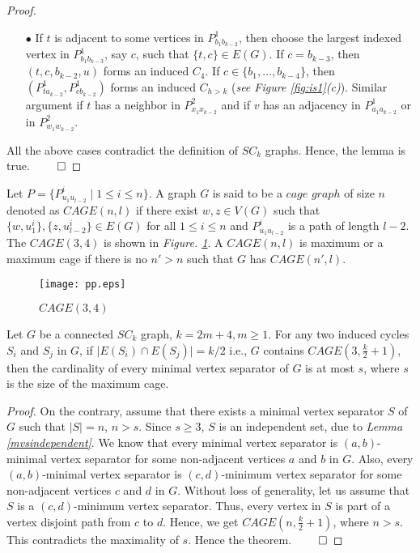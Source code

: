 \documentclass[runningheads]{llncs}
\begin{document}
\begin{proof}
\begin{description}
\begin{itemize}
\item[$\bullet$] If $t$ is adjacent to some vertices in $P^{1}_{b_1b_{k-2}}$, then choose the largest indexed vertex in $P^{1}_{b_1b_{k-3}}$, say $c$, such that  $\{t,c\}\in E(G)$. If $c=b_{k-3}$, then $(t,c, b_{k-2},u)$ forms an induced $C_4$. If $c \in \{b_1,\ldots,b_{k-4}\}$, then $(P^{1}_{ta_{k-2}}, P^{1}_{cb_{k-2}})$ forms an induced $C_{h > k}$ (\emph{see Figure  \ref{fig:is1}(c)}). Similar argument if $t$ has a neighbor in $P^{2}_{x_1x_{k-2}}$ and if $v$ has an adjacency in $P^{1}_{a_1a_{k-2}}$ or in $P^{2}_{w_1w_{k-2}}$.
\end{itemize}
\end{description}
All the above cases contradict the definition of $SC_k$ graphs. Hence, the lemma is true. $\hfill \qed$
\end{proof}


\begin{definition}
Let $P = \{ P_{u_1u_{l-2}}^{i} \mid 1\leq i \leq n\}$. A graph $G$ is said to be a $cage$ $graph$ of size $n$ denoted as $CAGE(n,l)$ if there exist $w,z \in V(G)$ such that $\{w,u_{1}^{i}\}, \{z,u_{l-2}^{i}\} \in E(G)$ for all $1 \leq i \leq n$ and $P_{u_1u_{l-2}}^{i} $ is a path of length $l-2$. The $CAGE(3,4)$ is shown in \emph{Figure. \ref{fig:pp}}. A $CAGE(n,l)$ is maximum or a maximum cage if there is no $n' > n$ such that $G$ has $CAGE(n',l)$.
\end{definition}



\begin{figure}[h]
\centering
\texttt{[image: pp.eps]}
\caption{$CAGE(3,4)$}
\label{fig:pp}
\end{figure}


\begin{theorem}
\label{mvssc2ksize}
Let $G$ be a connected $SC_k$ graph, $k=2m+4, m \geq 1$. For any two induced cycles $S_i$ and $S_j$ in $G$, if $\vert E(S_i) \cap E(S_j) \vert = k/2$ i.e., $G$ contains $CAGE(3, \frac{k}{2}+1)$, then the cardinality of every minimal vertex separator of $G$ is at most $s$, where $s$ is the size of the maximum cage. 
\end{theorem}
\begin{proof}
On the contrary, assume that there exists a minimal vertex separator $S$ of $G$ such that $\mid S\mid = n$, $n >s$. Since $s \geq 3$, $S$ is an independent set, due to \emph{Lemma \ref{mvsindependent}}. We know that every minimal vertex separator is $(a,b)$-minimal vertex separator for some non-adjacent vertices $a$ and $b$ in $G$. Also, every $(a,b)$-minimal vertex separator is $(c,d)$-minimum vertex separator for some non-adjacent vertices $c$ and $d$ in $G$. Without loss of generality, let us assume that $S$ is a $(c,d)$-minimum vertex separator. Thus, every vertex in $S$ is part of a vertex disjoint path from $c$ to $d$. Hence, we get $CAGE(n,\frac{k}{2}+1)$, where $n > s$. This contradicts the maximality of $s$. Hence the theorem. $\hfill\qed$
\end{proof}
\end{document}
